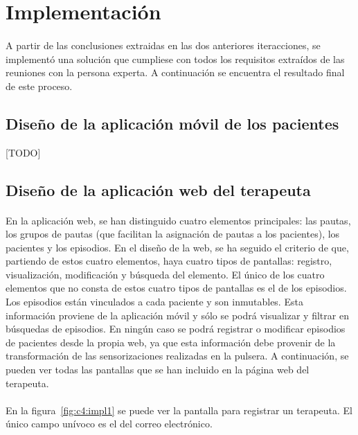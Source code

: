 \section{Implementación}
\label{sec:c4:impl}
\paragraph{}
A partir de las conclusiones extraidas en las dos anteriores iteracciones, se implementó una solución que cumpliese con todos los requisitos extraídos de las reuniones con la persona experta. A continuación se encuentra el resultado final de este proceso.

\subsection{Diseño de la aplicación móvil de los pacientes}
[TODO]

\subsection{Diseño de la aplicación web del terapeuta}
\paragraph{}
En la aplicación web, se han distinguido cuatro elementos principales: las pautas, los grupos de pautas (que facilitan la asignación de pautas a los pacientes), los pacientes y los episodios. En el diseño de la web, se ha seguido el criterio de que, partiendo de estos cuatro elementos, haya cuatro tipos de pantallas: registro, visualización, modificación y búsqueda del elemento. El único de los cuatro elementos que no consta de estos cuatro tipos de pantallas es el de los episodios. Los episodios están vinculados a cada paciente y son inmutables. Esta información proviene de la aplicación móvil y sólo se podrá visualizar y filtrar en búsquedas de episodios. En ningún caso se podrá registrar o modificar episodios de pacientes desde la propia web, ya que esta información debe provenir de la transformación de las sensorizaciones realizadas en la pulsera. A continuación, se pueden ver todas las pantallas que se han incluido en la página web del terapeuta.

\paragraph{}
En la figura~\ref{fig:c4:impl1} se puede ver la pantalla para registrar un terapeuta. El único campo unívoco es el del correo electrónico.

